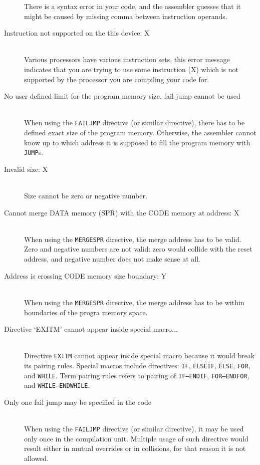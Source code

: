 \begin{description}
            There is a syntax error in your code, and the assembler guesses that it might be caused by missing comma between instruction operands.
        \item[Instruction not supported on the this device: X]~\\
            Various processors have various instruction sets, this error message indicates that you are trying to use some instruction (X) which is not supported by the processor you are compiling your code for.
        \item[No user defined limit for the program memory size, fail jump cannot be used]~\\
            When using the \texttt{FAILJMP} directive (or similar directive), there has to be defined exact size of the program memory. Otherwise, the assembler cannot know up to which address it is supposed to fill the program memory with \texttt{JUMP}s.
        \item[Invalid size: X]~\\
            Size cannot be zero or negative number.
        \item[Cannot merge DATA memory (SPR) with the CODE memory at address: X]~\\
            When using the \texttt{MERGESPR} directive, the merge address has to be valid. Zero and negative numbers are not valid: zero would collide with the reset address, and negative number does not make sense at all.
        \item[Address is crossing CODE memory size boundary: Y]~\\
            When using the \texttt{MERGESPR} directive, the merge address has to be within boundaries of the progra memory space.
        \item[Directive `EXITM' cannot appear inside special macro...]~\\
            Directive \texttt{EXITM} cannot appear inside special macro because it would break its pairing rules. Special macros include directives: \texttt{IF}, \texttt{ELSEIF}, \texttt{ELSE}, \texttt{FOR}, and \texttt{WHILE}. Term pairing rules refers to pairing of \texttt{IF--ENDIF}, \texttt{FOR--ENDFOR}, and \texttt{WHILE--ENDWHILE}.
        \item[Only one fail jump may be specified in the code]~\\
            When using the \texttt{FAILJMP} directive (or similar directive), it may be used only once in the compilation unit. Multiple usage of such directive would result either in mutual overrides or in collisions, for that reason it is not allowed.

\end{description}
